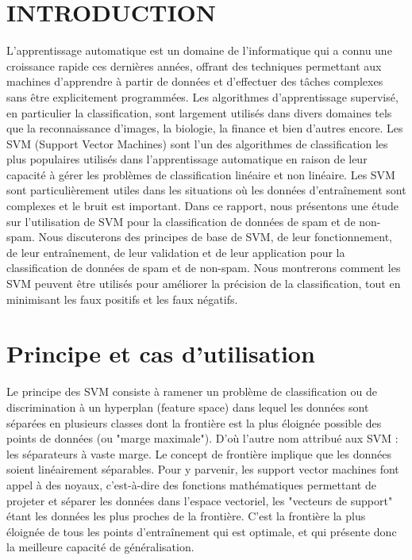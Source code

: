 \documentclass[12pt,a4paper]{report}
\begin{document}
	\clearpage
	
	\renewcommand{\thepage}{\arabic{page}}
	\setcounter{page}{1}
	
	\chapter*{INTRODUCTION    }
	\large
	L'apprentissage automatique est un domaine de l'informatique qui a connu une croissance rapide ces dernières années, offrant des techniques permettant aux machines d'apprendre à partir de données et d'effectuer des tâches complexes sans être explicitement programmées. Les algorithmes d'apprentissage supervisé, en particulier la classification, sont largement utilisés dans divers domaines tels que la reconnaissance d'images, la biologie, la finance et bien d'autres encore. Les SVM (Support Vector Machines) sont l'un des algorithmes de classification les plus populaires utilisés dans l'apprentissage automatique en raison de leur capacité à gérer les problèmes de classification linéaire et non linéaire. Les SVM sont particulièrement utiles dans les situations où les données d'entraînement sont complexes et le bruit est important. Dans ce rapport, nous présentons une étude sur l'utilisation de SVM pour la classification de données de spam et de non-spam. Nous discuterons des principes de base de SVM, de leur fonctionnement, de leur entraînement, de leur validation et de leur application pour la classification de données de spam et de non-spam. Nous montrerons comment les SVM peuvent être utilisés pour améliorer la précision de la classification, tout en minimisant les faux positifs et les faux négatifs.
	
	\newpage
	
	
	\chapter{Principe  et cas d'utilisation}
	Le principe des SVM consiste à ramener un problème de classification ou de discrimination à un hyperplan (feature space) dans lequel les données sont séparées en plusieurs classes dont la frontière est la plus éloignée possible des points de données (ou "marge maximale"). D'où l'autre nom attribué aux SVM : les séparateurs à vaste marge. Le concept de frontière implique que les données soient linéairement séparables. Pour y parvenir, les support vector machines font appel à des noyaux, c'est-à-dire des fonctions mathématiques permettant de projeter et séparer les données dans l'espace vectoriel, les "vecteurs de support" étant les données les plus proches de la frontière. C'est la frontière la plus éloignée de tous les points d'entraînement qui est optimale, et qui présente donc la meilleure capacité de généralisation. \\
	
\end{document}
